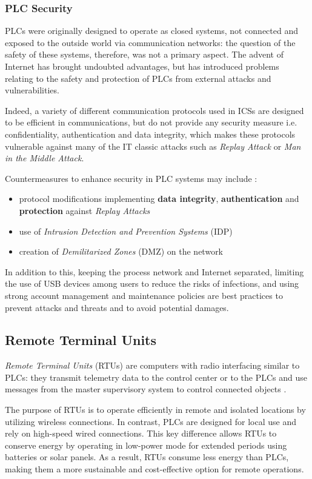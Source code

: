 \subsubsection{PLC Security}
\label{subsubsec:plc_security}
PLCs were originally designed to operate as closed systems, not connected and exposed to the outside world via communication networks: the question of the safety of these systems, therefore, was not a primary aspect. The advent of  Internet has brought undoubted advantages, but has introduced problems relating to the safety and protection of PLCs from external attacks and vulnerabilities.

Indeed, a variety of different communication protocols used in ICSs are designed to be efficient in communications, but do not provide any security measure i.e. confidentiality, authentication and data integrity, which makes these protocols vulnerable against many of the IT classic attacks such as \textit{Replay Attack} or \textit{Man in the Middle Attack}. 

\bigskip
Countermeasures to enhance security in PLC systems may include \cite{plc_security}:
\begin{itemize}
	\item protocol modifications implementing \textbf{data integrity}, \textbf{authentication} and \textbf{protection} against \textit{Replay Attacks}
	\item use of \textit{Intrusion Detection and Prevention Systems} (IDP) 
	\item creation of \textit{Demilitarized Zones} (DMZ) on the network
\end{itemize}

In addition to this, keeping the process network and Internet separated, limiting the use of USB devices among users to reduce the risks of infections, and using strong account management and maintenance policies are best practices to prevent attacks and threats and to avoid potential damages. 

\subsection{Remote Terminal Units}
\label{subsec:rtu}
\textit{Remote Terminal Units} (RTUs) are computers with radio interfacing similar to PLCs: they transmit telemetry data to the control center or to the PLCs and use messages from the master supervisory system to control connected objects \cite{rtu_definition}.

\bigskip
The purpose of RTUs is to operate efficiently in remote and isolated locations by utilizing wireless connections. In contrast, PLCs are designed for local use and rely on high-speed wired connections. This key difference allows RTUs to conserve energy by operating in low-power mode for extended periods using batteries or solar panels. As a result, RTUs consume less energy than PLCs, making them a more sustainable and cost-effective option for remote operations.

